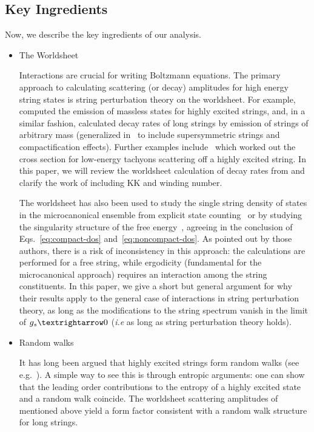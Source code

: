 \documentclass[a4paper,11pt]{article}
\begin{document}
\subsection*{Key Ingredients}

   Now, we describe the key ingredients of our analysis.

\begin{itemize}
    \item The Worldsheet 
    
 Interactions are crucial for writing Boltzmann equations. 
The primary approach to calculating scattering (or decay) amplitudes for high energy string states is string perturbation theory on the worldsheet. For example,~\cite{Amati:1999fv} computed the emission of massless states for highly excited strings, and, in a similar fashion, \cite{Manes:2001cs} calculated decay rates of long strings by emission of strings of arbitrary mass (generalized in~\cite{Chen:2005ra} to include supersymmetric strings and compactification effects). 
Further examples include~\cite{Manes:2003mw,Manes:2004nd} which worked out the cross section for low-energy tachyons scattering off a highly excited string. In this paper, we will review the worldsheet calculation of decay rates from \cite{Manes:2001cs} and clarify the work of \cite{Chen:2005ra} including KK and winding number.


The worldsheet has also been used to study the  single string density of states in the microcanonical ensemble from explicit state counting~\cite{Mitchell:1987th} or by studying the singularity structure of the free energy~\cite{Deo:1988jj,Deo:1989bv,Deo:1991mp}, agreeing in the conclusion of Eqs.~\eqref{eq:compact-dos} and~\eqref{eq:noncompact-dos}. As pointed out by those authors, there is a risk of inconsistency in this approach: the calculations are performed for a free string, while ergodicity (fundamental for the microcanonical approach) requires an interaction among the string constituents. In this paper, we give a short but general argument for why their results apply to the general case of interactions in string perturbation theory, as long as the modifications to the  string spectrum vanish in the limit of $g_s \textrightarrow 0$ (\textit{i.e} as long as string perturbation theory holds). 

    \item Random walks

    It has long been argued that highly excited strings form random walks (see e.g.~\cite{Mitchell:1987th}).
    A simple way to see this is through entropic arguments: one can show that the leading order contributions to the entropy of a highly excited state and a random walk coincide.
The worldsheet scattering amplitudes of~\cite{Manes:2003mw,Manes:2004nd} mentioned above yield a form factor consistent with a random walk structure for long strings.
    

\end{itemize}
\end{document}
